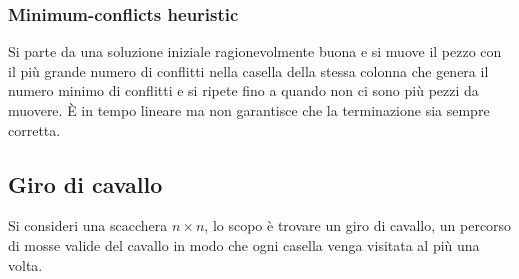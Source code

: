 \subsubsection{Minimum-conflicts heuristic}
Si parte da una soluzione iniziale ragionevolmente buona e si muove il pezzo con il pi\`u grande numero di conflitti nella casella della stessa colonna che genera il numero minimo di 
conflitti e si ripete fino a quando non ci sono pi\`u pezzi da muovere. \`E in tempo lineare ma non garantisce che la terminazione sia sempre corretta.
\subsection{Giro di cavallo}
Si consideri una scacchera $n\times n$, lo scopo \`e trovare un giro di cavallo, un percorso di mosse valide del cavallo in modo che ogni casella venga visitata al pi\`u una volta.
